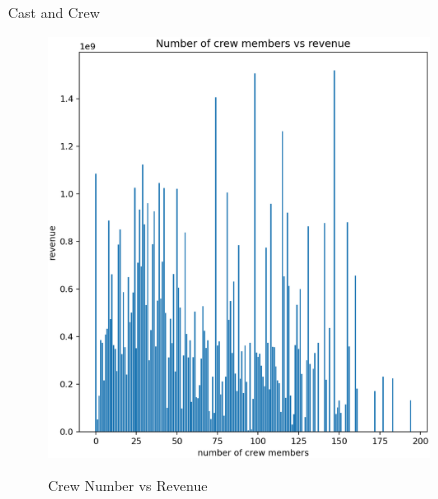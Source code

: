 \documentclass[
 size=14pt,
 paper=smartboard,  %
 mode=present, 		%
 display=slides, 	%
 style=tuliplab,  	%
 pauseslide,
 fleqn,leqno]{powerdot}
\begin{document}
\begin{slide}[toc=,bm=]{Cast and Crew}
\begin{figure}[htbp]
\begin{minipage}[t]{0.48\textwidth}
      \includegraphics[width=0.9\textwidth]{figures//crew.eps}\\
      \vspace{-1.4em}
      \caption{Crew Number vs Revenue}
    \end{minipage}
  \end{figure}
\end{slide}
\end{document}
